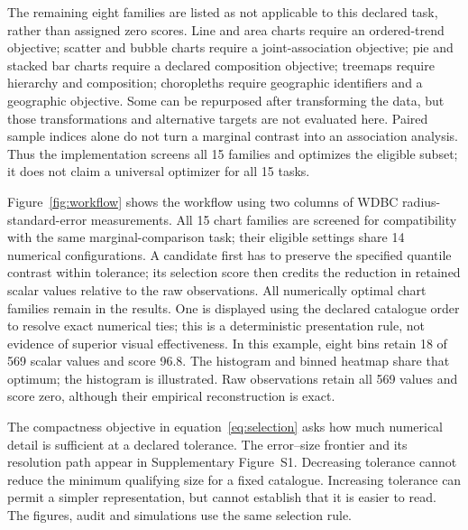 \documentclass[11pt]{article}
\begin{document}
The remaining eight families are listed as not applicable to this declared task, rather than assigned zero scores. Line and area charts require an ordered-trend objective; scatter and bubble charts require a joint-association objective; pie and stacked bar charts require a declared composition objective; treemaps require hierarchy and composition; choropleths require geographic identifiers and a geographic objective. Some can be repurposed after transforming the data, but those transformations and alternative targets are not evaluated here. Paired sample indices alone do not turn a marginal contrast into an association analysis. Thus the implementation screens all 15 families and optimizes the eligible subset; it does not claim a universal optimizer for all 15 tasks.

Figure~\ref{fig:workflow} shows the workflow using two columns of WDBC radius-standard-error measurements.\cite{wdbc} All 15 chart families are screened for compatibility with the same marginal-comparison task; their eligible settings share 14 numerical configurations. A candidate first has to preserve the specified quantile contrast within tolerance; its selection score then credits the reduction in retained scalar values relative to the raw observations. All numerically optimal chart families remain in the results. One is displayed using the declared catalogue order to resolve exact numerical ties; this is a deterministic presentation rule, not evidence of superior visual effectiveness. In this example, eight bins retain 18 of 569 scalar values and score 96.8. The histogram and binned heatmap share that optimum; the histogram is illustrated. Raw observations retain all 569 values and score zero, although their empirical reconstruction is exact.

The compactness objective in equation~\ref{eq:selection} asks how much numerical detail is sufficient at a declared tolerance. The error--size frontier and its resolution path appear in Supplementary Figure~S1. Decreasing tolerance cannot reduce the minimum qualifying size for a fixed catalogue. Increasing tolerance can permit a simpler representation, but cannot establish that it is easier to read. The figures, audit and simulations use the same selection rule.
\end{document}
